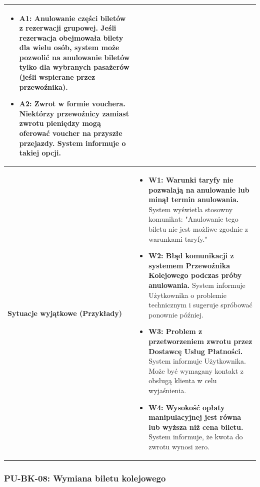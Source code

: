 \documentclass[a4paper,12pt]{article}
\begin{document}
\begin{longtable}{|p{\pierwszakolumnaszerokoscPUBKAnulowanie}|p{\drugakolumnaszerokoscPUBKAnulowanie}|}
\begin{itemize}
            \item \textbf{A1: Anulowanie części biletów z rezerwacji grupowej.} Jeśli rezerwacja obejmowała bilety dla wielu osób, system może pozwolić na anulowanie biletów tylko dla wybranych pasażerów (jeśli wspierane przez przewoźnika).
            \item \textbf{A2: Zwrot w formie vouchera.} Niektórzy przewoźnicy zamiast zwrotu pieniędzy mogą oferować voucher na przyszłe przejazdy. System informuje o takiej opcji.
        \end{itemize} \\
    \hline
    \textbf{Sytuacje wyjątkowe (Przykłady)} &
        \begin{itemize} \itemsep0pt \parskip0pt \parsep0pt
            \item \textbf{W1: Warunki taryfy nie pozwalają na anulowanie lub minął termin anulowania.} System wyświetla stosowny komunikat: "Anulowanie tego biletu nie jest możliwe zgodnie z warunkami taryfy."
            \item \textbf{W2: Błąd komunikacji z systemem Przewoźnika Kolejowego podczas próby anulowania.} System informuje Użytkownika o problemie technicznym i sugeruje spróbować ponownie później.
            \item \textbf{W3: Problem z przetworzeniem zwrotu przez Dostawcę Usług Płatności.} System informuje Użytkownika. Może być wymagany kontakt z obsługą klienta w celu wyjaśnienia.
            \item \textbf{W4: Wysokość opłaty manipulacyjnej jest równa lub wyższa niż cena biletu.} System informuje, że kwota do zwrotu wynosi zero.
        \end{itemize} \\
\end{longtable}
\endgroup

\subsubsection{PU-BK-08: Wymiana biletu kolejowego}

\begingroup %
\small %
\renewcommand{\arraystretch}{1.2} %

\newlength{\pierwszakolumnaszerokoscPUBKWymiana}
\setlength{\pierwszakolumnaszerokoscPUBKWymiana}{4.0cm}

\newlength{\drugakolumnaszerokoscPUBKWymiana}
\setlength{\drugakolumnaszerokoscPUBKWymiana}{\dimexpr\textwidth-\pierwszakolumnaszerokoscPUBKWymiana-2\tabcolsep-3\arrayrulewidth\relax}
\end{document}
